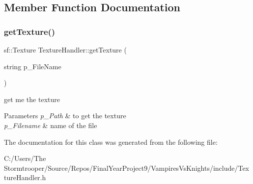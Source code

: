 \subsection{Member Function Documentation}
\mbox{\label{class_texture_handler_a14f9286e41340937add40ec11453b2b4}} 
\subsubsection{\texorpdfstring{get\+Texture()}{getTexture()}}
{\footnotesize\ttfamily sf\+::\+Texture Texture\+Handler\+::get\+Texture (\begin{DoxyParamCaption}\item[{string}]{p\+\_\+\+File\+Name }\end{DoxyParamCaption})}



get me the texture 


\begin{DoxyParams}{Parameters}
{\em p\+\_\+\+Path} & to get the texture \\
\hline
{\em p\+\_\+\+Filename} & name of the file \\
\hline
\end{DoxyParams}


The documentation for this class was generated from the following file\+:\begin{DoxyCompactItemize}
\item 
C\+:/\+Users/\+The Stormtrooper/\+Source/\+Repos/\+Final\+Year\+Project9/\+Vampires\+Vs\+Knights/include/Texture\+Handler.\+h\end{DoxyCompactItemize}
